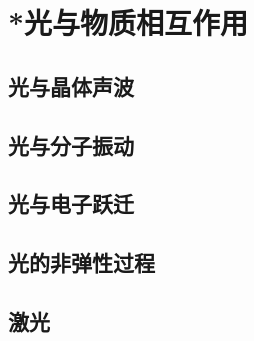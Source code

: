 

\section{*光与物质相互作用}\label{27-2}

\subsection{光与晶体声波}\label{27-2-1}

\subsection{光与分子振动}\label{27-2-2}

\subsection{光与电子跃迁}\label{27-2-3}

\subsection{光的非弹性过程}\label{27-2-4}

\subsection{激光}\label{27-2-5}

